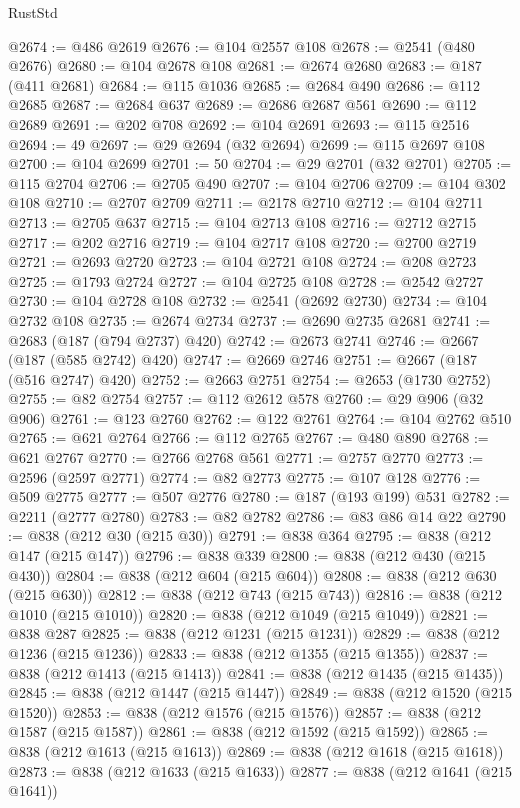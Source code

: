 \begin{lexlean}{RustStd}
\begin{coremodule}
{\begin{coremodule}
{{{{{{{{{{{{{{{{{{{{{{{{{{{{{{{{{{{{{{{{{{{{{{{{{{{{{{{@2674 := @486 @2619
@2676 := @104 @2557 @108
@2678 := @2541 (@480 @2676)
@2680 := @104 @2678 @108
@2681 := @2674 @2680
@2683 := @187 (@411 @2681)
@2684 := @115 @1036
@2685 := @2684 @490
@2686 := @112 @2685
@2687 := @2684 @637
@2689 := @2686 @2687 @561
@2690 := @112 @2689
@2691 := @202 @708
@2692 := @104 @2691
@2693 := @115 @2516
@2694 := 49
@2697 := @29 @2694 (@32 @2694)
@2699 := @115 @2697 @108
@2700 := @104 @2699
@2701 := 50
@2704 := @29 @2701 (@32 @2701)
@2705 := @115 @2704
@2706 := @2705 @490
@2707 := @104 @2706
@2709 := @104 @302 @108
@2710 := @2707 @2709
@2711 := @2178 @2710
@2712 := @104 @2711
@2713 := @2705 @637
@2715 := @104 @2713 @108
@2716 := @2712 @2715
@2717 := @202 @2716
@2719 := @104 @2717 @108
@2720 := @2700 @2719
@2721 := @2693 @2720
@2723 := @104 @2721 @108
@2724 := @208 @2723
@2725 := @1793 @2724
@2727 := @104 @2725 @108
@2728 := @2542 @2727
@2730 := @104 @2728 @108
@2732 := @2541 (@2692 @2730)
@2734 := @104 @2732 @108
@2735 := @2674 @2734
@2737 := @2690 @2735 @2681
@2741 := @2683 (@187 (@794 @2737) @420)
@2742 := @2673 @2741
@2746 := @2667 (@187 (@585 @2742) @420)
@2747 := @2669 @2746
@2751 := @2667 (@187 (@516 @2747) @420)
@2752 := @2663 @2751
@2754 := @2653 (@1730 @2752)
@2755 := @82 @2754
@2757 := @112 @2612 @578
@2760 := @29 @906 (@32 @906)
@2761 := @123 @2760
@2762 := @122 @2761
@2764 := @104 @2762 @510
@2765 := @621 @2764
@2766 := @112 @2765
@2767 := @480 @890
@2768 := @621 @2767
@2770 := @2766 @2768 @561
@2771 := @2757 @2770
@2773 := @2596 (@2597 @2771)
@2774 := @82 @2773
@2775 := @107 @128
@2776 := @509 @2775
@2777 := @507 @2776
@2780 := @187 (@193 @199) @531
@2782 := @2211 (@2777 @2780)
@2783 := @82 @2782
@2786 := @83 @86 @14 @22
@2790 := @838 (@212 @30 (@215 @30))
@2791 := @838 @364
@2795 := @838 (@212 @147 (@215 @147))
@2796 := @838 @339
@2800 := @838 (@212 @430 (@215 @430))
@2804 := @838 (@212 @604 (@215 @604))
@2808 := @838 (@212 @630 (@215 @630))
@2812 := @838 (@212 @743 (@215 @743))
@2816 := @838 (@212 @1010 (@215 @1010))
@2820 := @838 (@212 @1049 (@215 @1049))
@2821 := @838 @287
@2825 := @838 (@212 @1231 (@215 @1231))
@2829 := @838 (@212 @1236 (@215 @1236))
@2833 := @838 (@212 @1355 (@215 @1355))
@2837 := @838 (@212 @1413 (@215 @1413))
@2841 := @838 (@212 @1435 (@215 @1435))
@2845 := @838 (@212 @1447 (@215 @1447))
@2849 := @838 (@212 @1520 (@215 @1520))
@2853 := @838 (@212 @1576 (@215 @1576))
@2857 := @838 (@212 @1587 (@215 @1587))
@2861 := @838 (@212 @1592 (@215 @1592))
@2865 := @838 (@212 @1613 (@215 @1613))
@2869 := @838 (@212 @1618 (@215 @1618))
@2873 := @838 (@212 @1633 (@215 @1633))
@2877 := @838 (@212 @1641 (@215 @1641))
}}}}}}}}}}}}}}}}}}}}}}}}}}}}}}}}}}}}}}}}}}}}}}}}}}}}}}}
\end{coremodule}}
\end{coremodule}
\end{lexlean}
